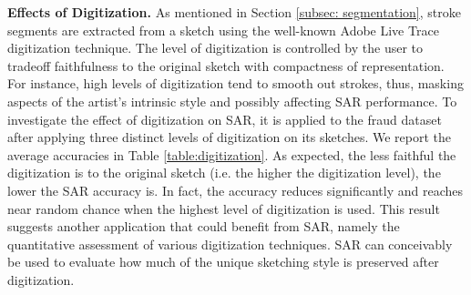 \noindent\textbf{Effects of Digitization.} As mentioned in Section \ref{subsec: segmentation}, stroke segments are extracted from a sketch using the well-known Adobe Live Trace digitization technique. The level of digitization is controlled by the user to tradeoff faithfulness to the original sketch with compactness of representation. For instance, high levels of digitization tend to smooth out strokes, thus, masking aspects of the artist's intrinsic style and possibly affecting SAR performance. To investigate the effect of digitization on SAR, it is applied to the fraud dataset after applying three distinct levels of digitization on its sketches. We report the average accuracies in Table \ref{table:digitization}. As expected, the less faithful the digitization is to the original sketch (i.e. the higher the digitization level), the lower the SAR accuracy is. In fact, the accuracy reduces significantly and reaches near random chance when the highest level of digitization is used. This result suggests another application that could benefit from SAR, namely the quantitative assessment of various digitization techniques. SAR can conceivably be used to evaluate how much of the unique sketching style is preserved after digitization.



